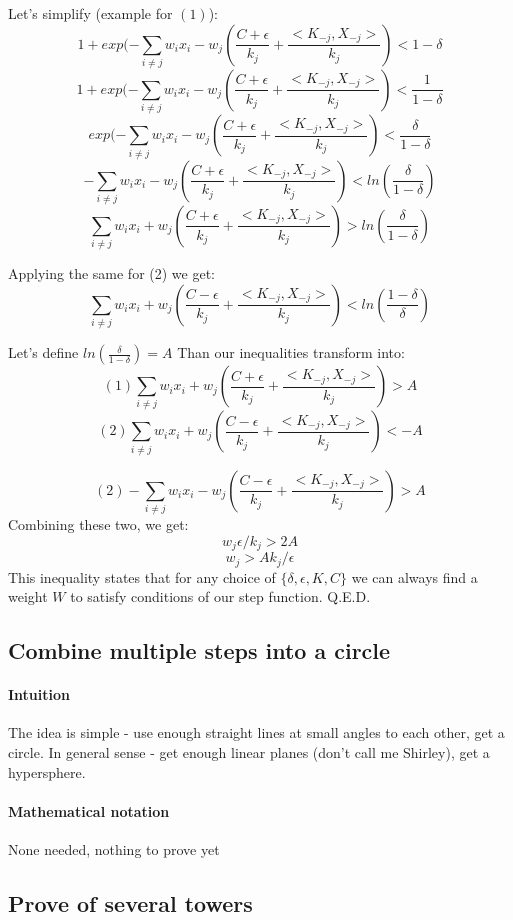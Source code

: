\documentclass{article}
\begin{document}
Let's simplify (example for $(1)$):
$$1 + exp(- \sum_{i \neq j}w_ix_i - w_j (\frac{C + \epsilon}{k_j} + \frac{<K_{-j} , X_{-j}>}{k_j}) < 1-\delta$$
$$1 + exp(- \sum_{i \neq j}w_ix_i - w_j (\frac{C + \epsilon}{k_j} + \frac{<K_{-j} , X_{-j}>}{k_j}) < \frac{1}{1-\delta}$$
$$exp(- \sum_{i \neq j}w_ix_i - w_j (\frac{C + \epsilon}{k_j} + \frac{<K_{-j} , X_{-j}>}{k_j}) < \frac{\delta}{1-\delta}$$
$$- \sum_{i \neq j}w_ix_i - w_j (\frac{C + \epsilon}{k_j} + \frac{<K_{-j} , X_{-j}>}{k_j}) < ln(\frac{\delta}{1-\delta})$$
$$\sum_{i \neq j}w_ix_i + w_j (\frac{C + \epsilon}{k_j} + \frac{<K_{-j} , X_{-j}>}{k_j}) > ln(\frac{\delta}{1-\delta})$$

Applying the same for (2) we get:
$$\sum_{i \neq j}w_ix_i + w_j (\frac{C - \epsilon}{k_j} + \frac{<K_{-j} , X_{-j}>}{k_j}) < ln(\frac{1-\delta}{\delta})$$

Let's define $ln(\frac{\delta}{1-\delta}) = A$
Than our inequalities transform into:
$$(1)\sum_{i \neq j}w_ix_i + w_j (\frac{C + \epsilon}{k_j} + \frac{<K_{-j} , X_{-j}>}{k_j}) > A $$
$$(2)\sum_{i \neq j}w_ix_i + w_j (\frac{C - \epsilon}{k_j} + \frac{<K_{-j} , X_{-j}>}{k_j}) < -A $$

$$(2) - \sum_{i \neq j}w_ix_i - w_j (\frac{C - \epsilon}{k_j} + \frac{<K_{-j} , X_{-j}>}{k_j}) > A $$
Combining these two, we get:
$$ w_j\epsilon/k_j > 2A$$
$$ w_j > A k_j/\epsilon$$
This inequality states that for any choice of $\{\delta, \epsilon, K, C\}$ we can always find a weight $W$ to satisfy conditions of our step function.
Q.E.D.

\subsection{Combine multiple steps into a circle}
\paragraph{Intuition}
The idea is simple - use enough straight lines at small angles to each other, get a circle.
In general sense - get enough linear planes (don't call me Shirley), get a hypersphere.

\paragraph{Mathematical notation}
None needed, nothing to prove yet

\subsection{Prove of several towers}
\end{document}
